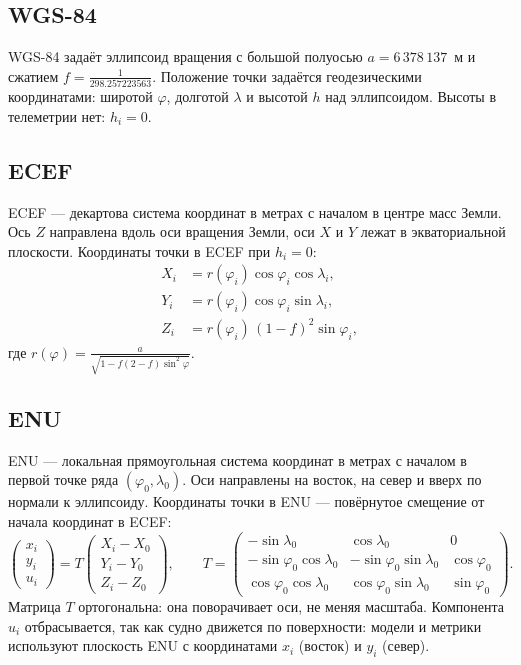 \documentclass[a4paper,12pt]{report}
\begin{document}
	\subsection{WGS-84}

	WGS-84 задаёт эллипсоид вращения с большой полуосью $a=6\,378\,137$~м и сжатием $f=\frac{1}{298.257223563}$.
	Положение точки задаётся геодезическими координатами: широтой $\varphi$, долготой $\lambda$ и высотой $h$ над эллипсоидом.
	Высоты в телеметрии нет: $h_i=0$.

	\subsection{ECEF}

	ECEF --- декартова система координат в метрах с началом в центре масс Земли.
	Ось $Z$ направлена вдоль оси вращения Земли, оси $X$ и $Y$ лежат в экваториальной плоскости.
	Координаты точки в ECEF при $h_i=0$:
	\begin{align*}
		X_i &= r(\varphi_i)\cos\varphi_i\cos\lambda_i,\\
		Y_i &= r(\varphi_i)\cos\varphi_i\sin\lambda_i,\\
		Z_i &= r(\varphi_i)\,(1-f)^2\sin\varphi_i,
	\end{align*}
	где $r(\varphi)=\frac{a}{\sqrt{1-f(2-f)\sin^2\varphi}}$.

	\subsection{ENU}

	ENU --- локальная прямоугольная система координат в метрах с началом в первой точке ряда $(\varphi_0,\lambda_0)$.
	Оси направлены на восток, на север и вверх по нормали к эллипсоиду.
	Координаты точки в ENU --- повёрнутое смещение от начала координат в ECEF:
	\[
		\begin{pmatrix}x_i\\ y_i\\ u_i\end{pmatrix}
		= T\begin{pmatrix}X_i-X_0\\ Y_i-Y_0\\ Z_i-Z_0\end{pmatrix},\qquad
		T=\begin{pmatrix}
			-\sin\lambda_0 & \cos\lambda_0 & 0\\
			-\sin\varphi_0\cos\lambda_0 & -\sin\varphi_0\sin\lambda_0 & \cos\varphi_0\\
			\cos\varphi_0\cos\lambda_0 & \cos\varphi_0\sin\lambda_0 & \sin\varphi_0
		\end{pmatrix}.
	\]
	Матрица $T$ ортогональна: она поворачивает оси, не меняя масштаба.
	Компонента $u_i$ отбрасывается, так как судно движется по поверхности: модели и метрики используют плоскость ENU с координатами $x_i$ (восток) и $y_i$ (север).
\end{document}
